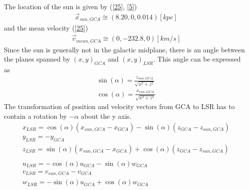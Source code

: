 \documentclass[letterpaper,10pt,english]{sphinxmanual}
\begin{document}
\sphinxAtStartPar
The location of the sun is given by ({[}\hyperlink{cite.NBodySimulation/Appendix:id28}{25}{]}, {[}\hyperlink{cite.NBodySimulation/Appendix:id29}{5}{]})
\begin{equation*}
\begin{split}\vec{x}_{sun,GCA} \cong  (8.20,0,0.014)[kpc]\end{split}
\end{equation*}
\sphinxAtStartPar
and the mean velocity ({[}\hyperlink{cite.NBodySimulation/Appendix:id28}{25}{]})
\begin{equation*}
\begin{split}\vec{v}_{mean,GCA} \cong  (0,-232.8,0)[km/s]\end{split}
\end{equation*}
\sphinxAtStartPar
Since the sun is generally not in the galactic midplane, there is an angle between the planes spanned by \((x,y)_{GCA}\) and \((x,y)_{LSR}\).
This angle can be expressed as
\begin{equation*}
\begin{split}\sin(\alpha) = \frac{z_{sun,GCA}}{\sqrt{x^2+z^2}} \\
\cos(\alpha) = \frac{x_{sun,GCA}}{\sqrt{x^2+z^2}}\end{split}
\end{equation*}
\sphinxAtStartPar
The transformation of position and velocity vectors from GCA to LSR has to contain a rotation by \(-\alpha\) about the y axis.
\begin{equation*}
\begin{split}x_{LSR} = \cos(\alpha)( x_{sun,GCA} - x_{GCA} ) - \sin(\alpha)(z_{GCA}-z_{sun,GCA}) \\
y_{LSR} = -y_{GCA} \\
z_{LSR} = \sin(\alpha)(x_{sun,GCA} - x_{GCA}) + \cos(\alpha)( z_{GCA} - z_{sun,GCA}) \\ \\
u_{LSR} = -\cos(\alpha)u_{GCA} - \sin(\alpha)w_{GCA} \\
v_{LSR} = v_{sun,GCA}-v_{GCA} \\
w_{LSR} = -\sin(\alpha)u_{GCA} + \cos(\alpha)w_{GCA} \\\end{split}
\end{equation*}
\end{document}
